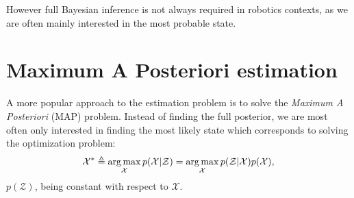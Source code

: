However full Bayesian inference is not always required in robotics contexts, as we are often mainly interested in the most probable state.

\section{Maximum A Posteriori estimation}

A more popular approach to the estimation problem is to solve the \textit{Maximum A Posteriori} (MAP) problem. Instead of finding the full posterior, we are most often only 
interested in finding the most likely state which corresponds to solving the optimization problem:
%
\begin{equation}
    \label{eq:MAP_pbe}
    \mathcal{X}^* \triangleq \operatorname*{arg\,max}_{\mathcal{X}} p(\mathcal{X} | \mathcal{Z}) = \operatorname*{arg\,max}_{\mathcal{X}} p(\mathcal{Z} | \mathcal{X}) p(\mathcal{X}),
\end{equation}
%
$p(\mathcal{Z})$, being constant with respect to $\mathcal{X}$.

